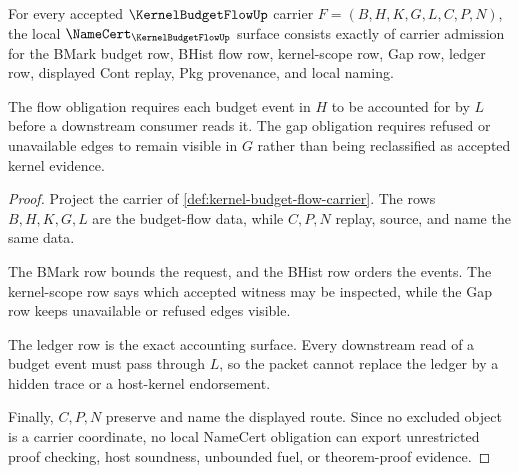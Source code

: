 \begin{theorem}
\label{thm:kernel-budget-flow-namecert-obligations}
For every accepted $\KernelBudgetFlowUp$ carrier $F=(B,H,K,G,L,C,P,N)$, the local $\NameCert_{\KernelBudgetFlowUp}$ surface consists exactly of carrier admission for the BMark budget row, BHist flow row, kernel-scope row, Gap row, ledger row, displayed Cont replay, Pkg provenance, and local naming.

The flow obligation requires each budget event in $H$ to be accounted for by $L$ before a downstream consumer reads it. The gap obligation requires refused or unavailable edges to remain visible in $G$ rather than being reclassified as accepted kernel evidence.
\end{theorem}
\begin{proof}
Project the carrier of \autoref{def:kernel-budget-flow-carrier}. The rows $B,H,K,G,L$ are the budget-flow data, while $C,P,N$ replay, source, and name the same data.

The BMark row bounds the request, and the BHist row orders the events. The kernel-scope row says which accepted witness may be inspected, while the Gap row keeps unavailable or refused edges visible.

The ledger row is the exact accounting surface. Every downstream read of a budget event must pass through $L$, so the packet cannot replace the ledger by a hidden trace or a host-kernel endorsement.

Finally, $C,P,N$ preserve and name the displayed route. Since no excluded object is a carrier coordinate, no local NameCert obligation can export unrestricted proof checking, host soundness, unbounded fuel, or theorem-proof evidence.
\end{proof}

